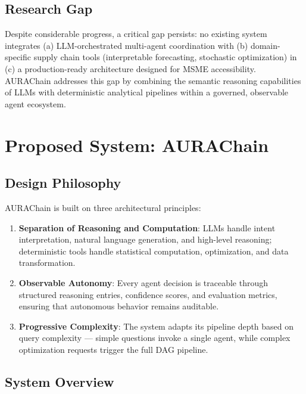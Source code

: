 \documentclass[conference]{IEEEtran}
\begin{document}
\subsection{Research Gap}

Despite considerable progress, a critical gap persists: no existing system integrates (a) LLM-orchestrated multi-agent coordination with (b) domain-specific supply chain tools (interpretable forecasting, stochastic optimization) in (c) a production-ready architecture designed for MSME accessibility. AURAChain addresses this gap by combining the semantic reasoning capabilities of LLMs with deterministic analytical pipelines within a governed, observable agent ecosystem.

\section{Proposed System: AURAChain}

\subsection{Design Philosophy}

AURAChain is built on three architectural principles:

\begin{enumerate}
    \item \textbf{Separation of Reasoning and Computation}: LLMs handle intent interpretation, natural language generation, and high-level reasoning; deterministic tools handle statistical computation, optimization, and data transformation.
    \item \textbf{Observable Autonomy}: Every agent decision is traceable through structured reasoning entries, confidence scores, and evaluation metrics, ensuring that autonomous behavior remains auditable.
    \item \textbf{Progressive Complexity}: The system adapts its pipeline depth based on query complexity --- simple questions invoke a single agent, while complex optimization requests trigger the full DAG pipeline.
\end{enumerate}

\subsection{System Overview}
\end{document}
